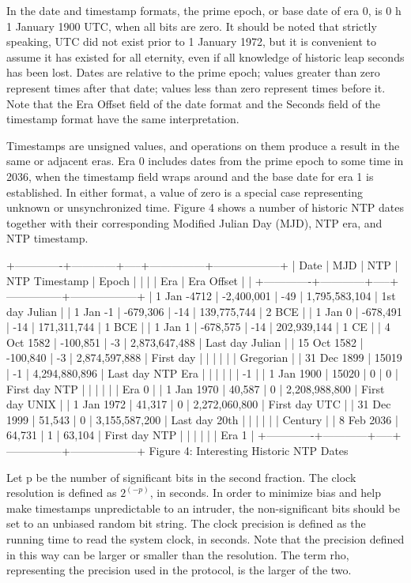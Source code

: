In the date and timestamp formats, the prime epoch, or base date of
era 0, is 0 h 1 January 1900 UTC, when all bits are zero. It should
be noted that strictly speaking, UTC did not exist prior to 1 January
1972, but it is convenient to assume it has existed for all eternity,
even if all knowledge of historic leap seconds has been lost. Dates
are relative to the prime epoch; values greater than zero represent
times after that date; values less than zero represent times before
it. Note that the Era Offset field of the date format and the
Seconds field of the timestamp format have the same interpretation.

Timestamps are unsigned values, and operations on them produce a
result in the same or adjacent eras. Era 0 includes dates from the
prime epoch to some time in 2036, when the timestamp field wraps
around and the base date for era 1 is established. In either format,
a value of zero is a special case representing unknown or
unsynchronized time. Figure 4 shows a number of historic NTP dates
together with their corresponding Modified Julian Day (MJD), NTP era,
and NTP timestamp.

+-------------+------------+-----+---------------+------------------+
| Date | MJD | NTP | NTP Timestamp | Epoch |
| | | Era | Era Offset | |
+-------------+------------+-----+---------------+------------------+
| 1 Jan -4712 | -2,400,001 | -49 | 1,795,583,104 | 1st day Julian |
| 1 Jan -1 | -679,306 | -14 | 139,775,744 | 2 BCE |
| 1 Jan 0 | -678,491 | -14 | 171,311,744 | 1 BCE |
| 1 Jan 1 | -678,575 | -14 | 202,939,144 | 1 CE |
| 4 Oct 1582 | -100,851 | -3 | 2,873,647,488 | Last day Julian |
| 15 Oct 1582 | -100,840 | -3 | 2,874,597,888 | First day |
| | | | | Gregorian |
| 31 Dec 1899 | 15019 | -1 | 4,294,880,896 | Last day NTP Era |
| | | | | -1 |
| 1 Jan 1900 | 15020 | 0 | 0 | First day NTP |
| | | | | Era 0 |
| 1 Jan 1970 | 40,587 | 0 | 2,208,988,800 | First day UNIX |
| 1 Jan 1972 | 41,317 | 0 | 2,272,060,800 | First day UTC |
| 31 Dec 1999 | 51,543 | 0 | 3,155,587,200 | Last day 20th |
| | | | | Century |
| 8 Feb 2036 | 64,731 | 1 | 63,104 | First day NTP |
| | | | | Era 1 |
+-------------+------------+-----+---------------+------------------+
Figure 4: Interesting Historic NTP Dates

Let p be the number of significant bits in the second fraction. The
clock resolution is defined as $2^(-p)$, in seconds. In order to
minimize bias and help make timestamps unpredictable to an intruder,
the non-significant bits should be set to an unbiased random bit
string. The clock precision is defined as the running time to read
the system clock, in seconds. Note that the precision defined in
this way can be larger or smaller than the resolution. The term rho,
representing the precision used in the protocol, is the larger of the
two.

